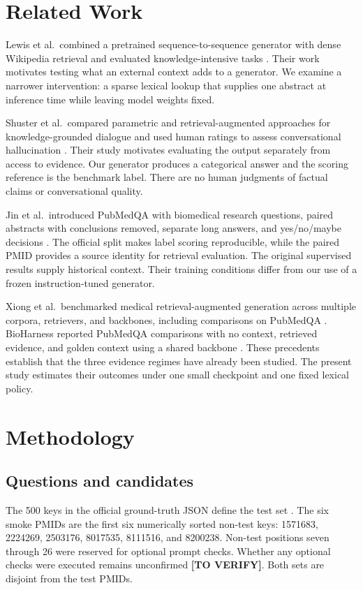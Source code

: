 \documentclass[manuscript,nonacm]{acmart}
\begin{document}
\section{Related Work}
Lewis et al.\ combined a pretrained sequence-to-sequence generator with dense Wikipedia retrieval and evaluated knowledge-intensive tasks \cite{lewis2020}. Their work motivates testing what an external context adds to a generator. We examine a narrower intervention: a sparse lexical lookup that supplies one abstract at inference time while leaving model weights fixed.

Shuster et al.\ compared parametric and retrieval-augmented approaches for knowledge-grounded dialogue and used human ratings to assess conversational hallucination \cite{shuster2021}. Their study motivates evaluating the output separately from access to evidence. Our generator produces a categorical answer and the scoring reference is the benchmark label. There are no human judgments of factual claims or conversational quality.

Jin et al.\ introduced PubMedQA with biomedical research questions, paired abstracts with conclusions removed, separate long answers, and yes/no/maybe decisions \cite{jin2019}. The official split makes label scoring reproducible, while the paired PMID provides a source identity for retrieval evaluation. The original supervised results supply historical context. Their training conditions differ from our use of a frozen instruction-tuned generator.

Xiong et al.\ benchmarked medical retrieval-augmented generation across multiple corpora, retrievers, and backbones, including comparisons on PubMedQA \cite{xiong2024}. BioHarness reported PubMedQA comparisons with no context, retrieved evidence, and golden context using a shared backbone \cite{xiao2026}. These precedents establish that the three evidence regimes have already been studied. The present study estimates their outcomes under one small checkpoint and one fixed lexical policy.

\section{Methodology}
\subsection{Questions and candidates}
The 500 keys in the official ground-truth JSON define the test set \cite{jin2019,pqadata}. The six smoke PMIDs are the first six numerically sorted non-test keys: 1571683, 2224269, 2503176, 8017535, 8111516, and 8200238. Non-test positions seven through 26 were reserved for optional prompt checks. Whether any optional checks were executed remains unconfirmed \textbf{[TO VERIFY]}. Both sets are disjoint from the test PMIDs.
\end{document}
